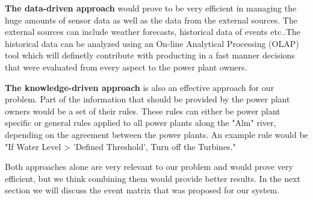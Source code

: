 \textbf{The data-driven approach} would prove to be very efficient in managing the huge amounts of sensor data as well as the data from the external sources. The external sources can include weather forecasts, historical data of events etc..The historical data can be analyzed using an On-line Analytical Processing (OLAP) tool which will definetly contribute with producting in a fast manner decisions that were evaluated from every aspect to the power plant owners.

\textbf{The knowledge-driven approach} is also an effective approach for our problem. Part of the information that should be provided by the power plant owners would be a set of their rules. These rules can either be power plant specific or general rules applied to all power plants along the "Alm" river, depending on the agreement between the power plants. An example rule would be "If Water Level > 'Defined Threshold', Turn off the Turbines."

Both approaches alone are very relevant to our problem and would prove very efficient, but we think combining them would provide better results. In the next section we will discuss the event matrix that was proposed for our system.

